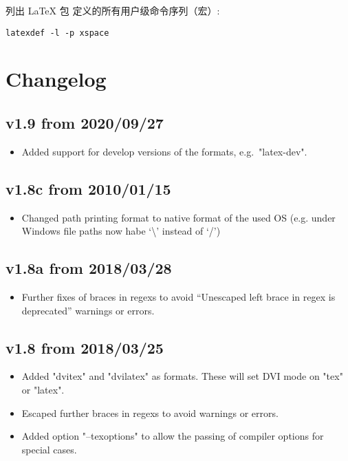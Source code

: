 \documentclass{article}
\begin{document}
列出 LaTeX 包  定义的所有用户级命令序列（宏）:

\begin{verbatim}
latexdef -l -p xspace
\end{verbatim}


\section{Changelog}

\subsection*{v1.9 from 2020/09/27}
\begin{itemize}
 \item Added support for develop versions of the formats, e.g.\ "latex-dev".
\end{itemize}

\subsection*{v1.8c from 2010/01/15}
\begin{itemize}
 \item Changed path printing format to native format of the used OS 
      (e.g. under Windows file paths now habe `\textbackslash' instead of `/')
\end{itemize}

\subsection*{v1.8a from 2018/03/28}
\begin{itemize}
 \item Further fixes of braces in regexs to avoid ``Unescaped left brace in regex is deprecated'' warnings or errors.
\end{itemize}

\subsection*{v1.8 from 2018/03/25}
\begin{itemize}
 \item Added "dvitex" and "dvilatex" as formats. These will set DVI mode on "tex" or "latex".
 \item Escaped further braces in regexs to avoid warnings or errors.
 \item Added option "--texoptions" to allow the passing of compiler options for special cases.
\end{itemize}
\end{document}
